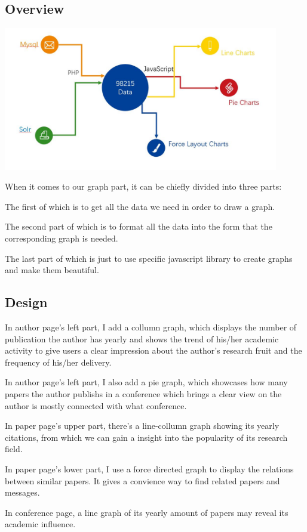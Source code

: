 \documentclass[10pt,twoside,a4paper,titlepage]{article}
\begin{document}
	\subsection{Overview}
		\includegraphics[width=0.9\textwidth]{gjl/overview.jpg}\newline\par
		When it comes to our graph part, it can be chiefly divided into three parts: \newline \par
		The first of which is to get all the data we need in order to draw a graph.\newline\par
		The second part of which is to format all the data into the form that the corresponding graph is needed.\newline\par
		The last part of which is just to use specific javascript library to create graphs and make them beautiful. \newline\par
		

	\subsection{Design}
		\par In author page’s left part, I add a collumn graph, which displays the number of publication the author has yearly and
shows the trend of his/her academic activity to give users a clear impression about the author’s research fruit and the frequency of his/her delivery.
		\par In author page’s left part, I also add a pie graph, which showcases how many papers the author publishs in a conference which brings a clear view on the author is mostly connected with what conference.
		\par In paper page's upper part, there’s a line-collumn graph showing its yearly citations, from which we can gain a insight into the popularity of its research field.
		\par In paper page's lower part, I use a force directed graph to display the relations between similar papers. It gives a convience way to find related papers and messages.
		\par In conference page, a line graph of its yearly amount of papers may reveal its academic influence.
\end{document}
